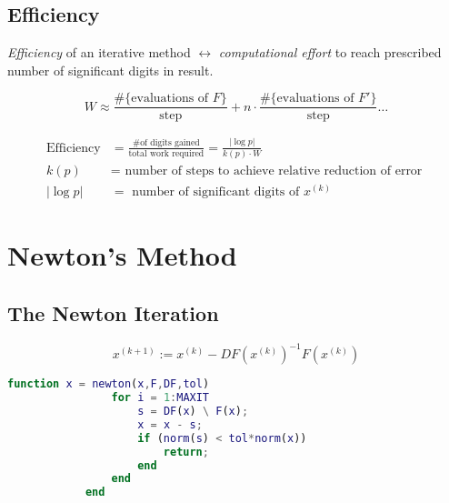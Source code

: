 	\subsection{Efficiency}
		\emph{Efficiency} of an iterative method $\leftrightarrow$ \emph{computational effort} to reach prescribed number of significant digits in result.
		\begin{notice}
			\[
			 W \approx \frac{\# \{\text{evaluations of $F$}\}}{\text{step}} + n \cdot \frac{\# \{\text{evaluations of $F'$}\}}{\text{step}} \ldots
			\]
		\end{notice}
		\begin{definition}[Efficiency]
			\begin{align*}
			\text{Efficiency} &= \frac{\text{\# of digits gained}}{\text{total work required}} = \frac{|\log p|}{k(p)\cdot W}\\
			k(p) &= \text{ number of steps to achieve relative reduction of error }\\
			|\log p|  &= \text{ number of significant digits of $x^{(k)}$}
			\end{align*}
		\end{definition}
\section{Newton's Method}
	\subsection{The Newton Iteration}
		\begin{definition}
			\[
			x^{(k+1)} :=  x^{(k)}-DF\left( x^{(k)}\right)^{-1} F\left( x^{(k)}\right)
			\]
		\end{definition}

		\begin{lstlisting}[language=matlab]
			function x = newton(x,F,DF,tol)
				for i = 1:MAXIT
					s = DF(x) \ F(x);
					x = x - s;
					if (norm(s) < tol*norm(x))
						return;
					end
				end
			end
		\end{lstlisting}

